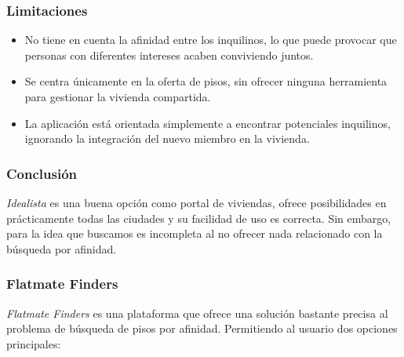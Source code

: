 \subsubsection*{Limitaciones}
\begin{itemize}
    \item No tiene en cuenta la afinidad entre los inquilinos, lo que puede provocar que personas con diferentes intereses acaben conviviendo juntos.
    \item Se centra únicamente en la oferta de pisos, sin ofrecer ninguna herramienta para gestionar la vivienda compartida.
    \item La aplicación está orientada simplemente a encontrar potenciales inquilinos, ignorando la integración del nuevo miembro en la vivienda.
\end{itemize}

\subsubsection*{Conclusión}
\emph{Idealista} es una buena opción como portal de viviendas, ofrece posibilidades en prácticamente todas las ciudades y su facilidad de uso es correcta. Sin embargo, para la idea que buscamos es incompleta al no ofrecer nada relacionado con la búsqueda por afinidad.

\subsubsection{Flatmate Finders}
\emph{Flatmate Finders} \cite{Flatmatefinders} es una plataforma que ofrece una solución bastante precisa al problema de búsqueda de pisos por afinidad. Permitiendo al usuario dos opciones principales:

